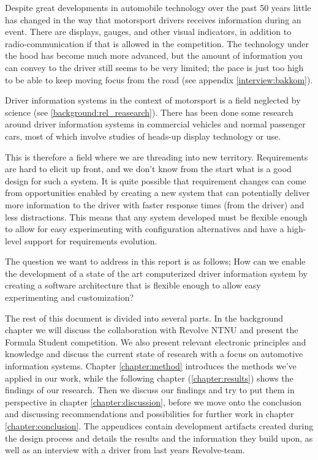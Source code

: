 Despite great developments in automobile technology over the past 50 years little
has changed in the way that motorsport drivers receives information during an
event. There are displays, gauges, and other visual indicators\footnotemark[1]
, in addition to radio-communication \cite{wiki:formula_radio} if that is allowed in the competition. The technology under the hood
has become much more advanced, but the amount of information you can
convey to the driver still seems to be very limited; the pace is just too high
to be able to keep moving focus from the road (see appendix \vref{interview:bakkom}).

Driver information systems in the context of motorsport is a field neglected by
science (see \vref{background:rel_reasearch}). There has been done some
research around driver information systems in commercial vehicles and normal 
passenger cars, most of which involve studies of heads-up display technology or
use.

This is therefore a field where we are threading into new territory. 
Requirements are hard to elicit up front, and we don't know
from the start what is a good design for such a system. It is quite possible
that requirement changes can come from opportunities enabled by 
creating a new system that can potentially deliver more information to the
driver with faster response times (from the driver) and less distractions. 
This means that any system developed must be flexible enough to allow for easy 
experimenting with configuration
alternatives and have a high-level support for requirements evolution.

The question we want to address in this report is as follows; How can we
enable the development of a state of the art computerized driver information system
by creating a software architecture that is flexible enough to allow easy
experimenting and customization?

The rest of this document is divided into several parts. In the background chapter we will
discuss the collaboration with Revolve NTNU and present the Formula Student
competition. We also present relevant electronic principles and knowledge and discuss the current
state of research with a focus on automotive information systems. Chapter \vref{chapter:method}
introduces the methods we've applied in our work, while
the following chapter (\vref{chapter:results}) shows the findings of our research.
Then we discuss our findings and try to put them in perspective in chapter \vref{chapter:discussion}, before we move
onto the conclusion and discussing recommendations and possibilities for
further work in chapter \vref{chapter:conclusion}.
The appendices contain development artifacts created during the design process
and details the results and the information they build upon, as well as an interview with a driver from last years Revolve-team. 


